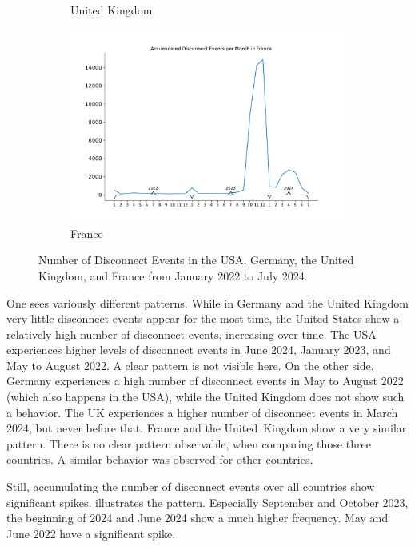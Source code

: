 \begin{figure}
\begin{subfigure}[b]{0.48\linewidth}
		\caption{United Kingdom}
	\end{subfigure}
	\begin{subfigure}[b]{0.48\linewidth}
		\includegraphics[width=\linewidth]{./chapters/4-results/disconnect_events/FR.pdf}
		\caption{France}
	\end{subfigure}
	\caption{Number of Disconnect Events in the USA, Germany, the
		United Kingdom, and France from January 2022 to July 2024.}
	\label{fig:disconnect-events-absolute}
\end{figure}

One sees variously different patterns. While in Germany and the United Kingdom
very little disconnect events appear for the most time, the United States show
a relatively high number of disconnect events, increasing over time. The USA
experiences higher levels of disconnect events in June 2024, January 2023, and
May to August 2022. A clear pattern is not visible here. On the other side,
Germany experiences a high number of disconnect events in May to August 2022
(which also happens in the USA), while the United Kingdom does not show such a
behavior. The UK experiences a higher number of disconnect events in March
2024, but never before that. France and the United~Kingdom show a very similar
pattern. There is no clear pattern observable, when comparing those three
countries. A similar behavior was observed for other countries.

Still, accumulating the number of disconnect events over all countries show
significant spikes. 
illustrates the pattern. Especially September and October 2023, the beginning
of 2024 and June 2024 show a much higher frequency. May and June 2022 have a
significant spike.

